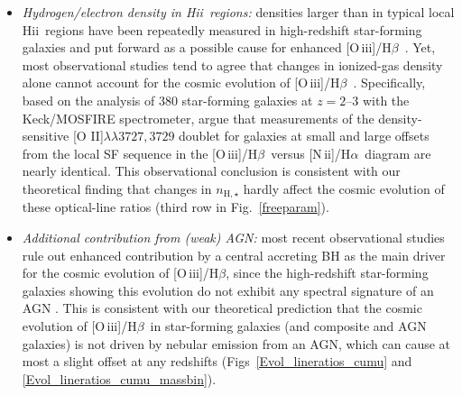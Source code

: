 \documentclass[fleqn,usenatbib]{mnras}
\newcommand{\hii}{\hbox{H{\sc ii}}}
\newcommand{\oiiihb}{\hbox{[O\,{\sc iii}]/H$\beta$}}
\newcommand{\niiha}{\hbox{[N\,{\sc ii}]/H$\alpha$}}
\begin{document}
\begin{itemize}
\item{\it Hydrogen/electron density in \hii\ regions:}
densities larger than in typical local \hii\ regions have
been repeatedly measured in high-redshift star-forming galaxies and
put forward as a possible cause for enhanced \oiiihb\
\citep[e.g.][]{Brinchmann08,  Lehnert09,Steidel14,Sanders16}. Yet,
most observational studies tend to  agree that changes in ionized-gas
density alone cannot account for the cosmic evolution of \oiiihb\
\citep[e.g.,][]{Rigby11,Hayashi15,Kashino17,Strom17}. Specifically,
based on the analysis of 380 star-forming galaxies at $z=2$--3 with
the  Keck/MOSFIRE spectrometer, \citet{Strom17} argue that
measurements  of the density-sensitive [O{\sc
  II}]$\lambda\lambda3727,3729$ doublet for  galaxies at small and
large offsets from the local SF sequence in the  \oiiihb\ versus
\niiha\ diagram are nearly identical. This observational  conclusion
is consistent with our theoretical finding that changes in
$n_{\mathrm{H}, \star}$ hardly affect the cosmic evolution of these
optical-line ratios (third row in Fig.~\ref{freeparam}).

\item{\it Additional contribution from (weak) AGN:}
most recent observational studies rule out enhanced contribution  
by a central accreting BH as the main driver for the cosmic evolution
of  \oiiihb, since the high-redshift star-forming galaxies showing
this evolution do not exhibit any spectral signature of an AGN
\citep[such as strong  high-ionization
lines;][]{Steidel14,Strom17,Kashino17}. This is consistent  with our
theoretical prediction that the cosmic evolution of \oiiihb\ in
star-forming galaxies (and composite and AGN galaxies) is not driven
by nebular emission from an AGN, which can cause at most a slight
offset  at any redshifts (Figs~\ref{Evol_lineratios_cumu} and 
\ref{Evol_lineratios_cumu_massbin}).


\end{itemize}
\end{document}
